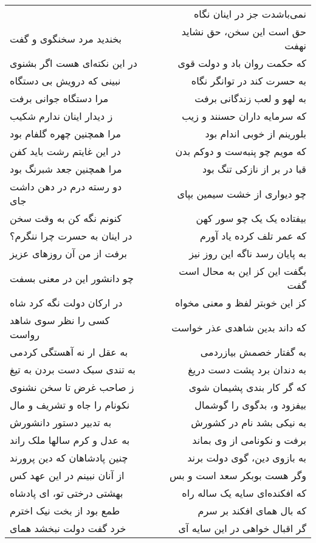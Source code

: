 \begin{center}
\begin{longtable}{l p{0.5cm} r}
&&
نمی‌باشدت جز در اینان نگاه
\\
بخندید مرد سخنگوی و گفت
&&
حق است این سخن، حق نشاید نهفت
\\
در این نکته‌ای هست اگر بشنوی
&&
که حکمت روان باد و دولت قوی
\\
نبینی که درویش بی دستگاه
&&
به حسرت کند در توانگر نگاه
\\
مرا دستگاه جوانی برفت
&&
به لهو و لعب زندگانی برفت
\\
ز دیدار اینان ندارم شکیب
&&
که سرمایه داران حسنند و زیب
\\
مرا همچنین چهره گلفام بود
&&
بلورینم از خوبی اندام بود
\\
در این غایتم رشت باید کفن
&&
که مویم چو پنبه‌ست و دوکم بدن
\\
مرا همچنین جعد شبرنگ بود
&&
قبا در بر از نازکی تنگ بود
\\
دو رسته درم در دهن داشت جای
&&
چو دیواری از خشت سیمین بپای
\\
کنونم نگه کن به وقت سخن
&&
بیفتاده یک یک چو سور کهن
\\
در اینان به حسرت چرا ننگرم؟
&&
که عمر تلف کرده یاد آورم
\\
برفت از من آن روزهای عزیز
&&
به پایان رسد ناگه این روز نیز
\\
چو دانشور این در معنی بسفت
&&
بگفت این کز این به محال است گفت
\\
در ارکان دولت نگه کرد شاه
&&
کز این خوبتر لفظ و معنی مخواه
\\
کسی را نظر سوی شاهد رواست
&&
که داند بدین شاهدی عذر خواست
\\
به عقل ار نه آهستگی کردمی
&&
به گفتار خصمش بیازردمی
\\
به تندی سبک دست بردن به تیغ
&&
به دندان برد پشت دست دریغ
\\
ز صاحب غرض تا سخن نشنوی
&&
که گر کار بندی پشیمان شوی
\\
نکونام را جاه و تشریف و مال
&&
بیفزود و، بدگوی را گوشمال
\\
به تدبیر دستور دانشورش
&&
به نیکی بشد نام در کشورش
\\
به عدل و کرم سالها ملک راند
&&
برفت و نکونامی از وی بماند
\\
چنین پادشاهان که دین پرورند
&&
به بازوی دین، گوی دولت برند
\\
از آنان نبینم در این عهد کس
&&
وگر هست بوبکر سعد است و بس
\\
بهشتی درختی تو، ای پادشاه
&&
که افکنده‌ای سایه یک ساله راه
\\
طمع بود از بخت نیک اخترم
&&
که بال همای افکند بر سرم
\\
خرد گفت دولت نبخشد همای
&&
گر اقبال خواهی در این سایه آی

\end{longtable}
\end{center}
